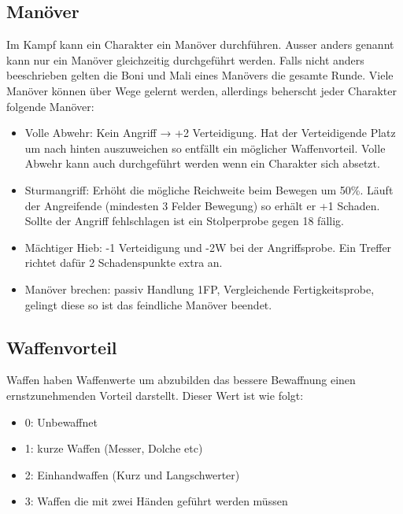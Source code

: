 \documentclass{article}
\begin{document}
\begin{center}
\subsection{Manöver}
\end{center}

Im Kampf kann ein Charakter ein Manöver durchführen. Ausser anders genannt kann nur ein Manöver gleichzeitig
durchgeführt werden. Falls nicht anders beeschrieben gelten die Boni und Mali eines Manövers die gesamte Runde.
Viele Manöver können über Wege gelernt werden, allerdings beherscht jeder Charakter folgende Manöver:

\begin{itemize}
\item Volle Abwehr: Kein Angriff → +2 Verteidigung. Hat der Verteidigende Platz um nach hinten auszuweichen so entfällt ein möglicher Waffenvorteil. Volle Abwehr kann auch durchgeführt werden wenn ein Charakter sich absetzt.
\item Sturmangriff: Erhöht die mögliche Reichweite beim Bewegen um 50\%. Läuft der Angreifende (mindesten 3 Felder Bewegung) so erhält er +1 Schaden. Sollte der Angriff fehlschlagen ist ein Stolperprobe gegen 18 fällig.
\item Mächtiger Hieb: -1 Verteidigung und -2W bei der Angriffsprobe. Ein Treffer richtet dafür 2 Schadenspunkte extra an.
\item Manöver brechen: passiv Handlung 1FP, Vergleichende Fertigkeitsprobe, gelingt diese so ist das feindliche Manöver beendet.
\end{itemize}

\begin{center}
\subsection{Waffenvorteil}
\end{center}

Waffen haben Waffenwerte um abzubilden das bessere Bewaffnung einen ernstzunehmenden Vorteil darstellt. Dieser Wert
ist wie folgt:

\begin{itemize}
\item 0: Unbewaffnet
\item 1: kurze Waffen (Messer, Dolche etc)
\item 2: Einhandwaffen (Kurz und Langschwerter)
\item 3: Waffen die mit zwei Händen geführt werden müssen
\end{itemize}
\end{document}
